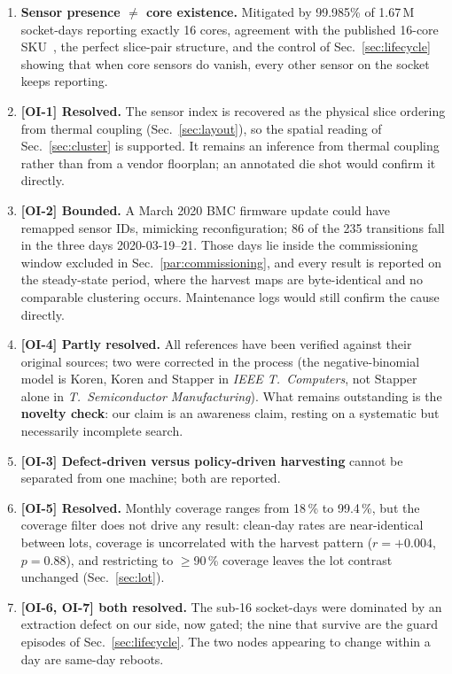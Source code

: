 \documentclass[10pt,conference]{IEEEtran}
\begin{document}
\begin{enumerate}
\item \textbf{Sensor presence $\ne$ core existence.} Mitigated by 99.985\% of 1.67\,M socket-days
reporting exactly 16 cores, agreement with the published 16-core SKU~\cite{ibm_ac922}, the perfect
slice-pair structure, and the control of Sec.~\ref{sec:lifecycle} showing that when core sensors do
vanish, every other sensor on the socket keeps reporting.
\item \textbf{[OI-1] Resolved.} The sensor index is recovered as the physical slice ordering from
thermal coupling (Sec.~\ref{sec:layout}), so the spatial reading of Sec.~\ref{sec:cluster} is
supported. It remains an inference from thermal coupling rather than from a vendor floorplan; an
annotated die shot would confirm it directly.
\item \textbf{[OI-2] Bounded.} A March 2020 BMC firmware update could have remapped sensor IDs,
mimicking reconfiguration; 86 of the 235 transitions fall in the three days 2020-03-19--21. Those
days lie inside the commissioning window excluded in Sec.~\ref{par:commissioning}, and every
result is reported on the steady-state period, where the harvest maps are byte-identical and no
comparable clustering occurs. Maintenance logs would still confirm the cause directly.
\item \textbf{[OI-4] Partly resolved.} All references have been verified against their original
sources; two were corrected in the process (the negative-binomial model is Koren, Koren and
Stapper in \emph{IEEE T.\ Computers}, not Stapper alone in \emph{T.\ Semiconductor
Manufacturing}). What remains outstanding is the \textbf{novelty check}: our claim is an
awareness claim, resting on a systematic but necessarily incomplete search.
\item \textbf{[OI-3] Defect-driven versus policy-driven harvesting} cannot be separated from one
machine; both are reported.
\item \textbf{[OI-5] Resolved.} Monthly coverage ranges from 18\,\% to 99.4\,\%, but the
coverage filter does not drive any result: clean-day rates are near-identical between lots,
coverage is uncorrelated with the harvest pattern ($r=+0.004$, $p=0.88$), and restricting to
$\ge$90\,\% coverage leaves the lot contrast unchanged (Sec.~\ref{sec:lot}).
\item \textbf{[OI-6, OI-7] both resolved.} The sub-16 socket-days were dominated by an
extraction defect on our side, now gated; the nine that survive are the guard episodes of
Sec.~\ref{sec:lifecycle}. The two nodes appearing to change within a day are same-day reboots.

\end{enumerate}
\end{document}
